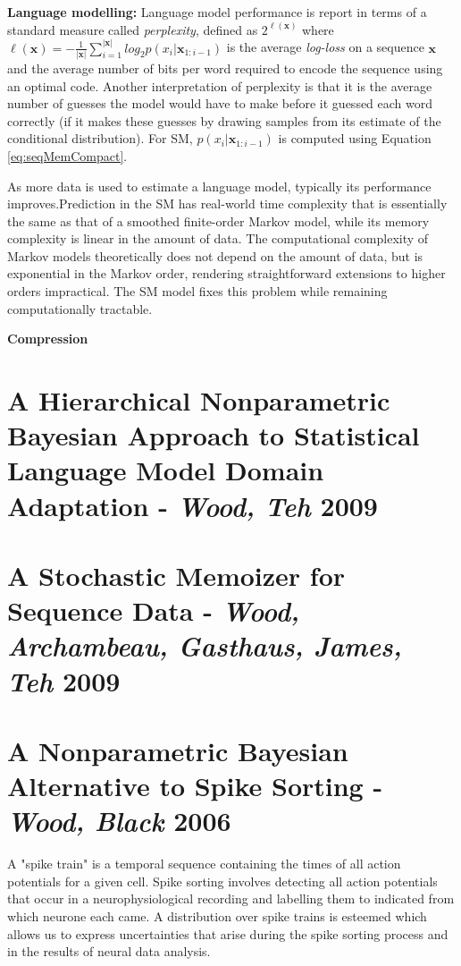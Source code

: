 \textbf{Language modelling:} Language model performance is report in terms of a standard measure called \textit{perplexity}, defined as $2^{\ell(\boldsymbol x)}$ where $\ell(\boldsymbol x)=-\frac{1}{|\boldsymbol x|}\sum_{i=1}^{|\boldsymbol x|}log_{2}p(x_{i}|\boldsymbol x_{1:i-1})$ is the average \textit{log-loss} on a sequence $\boldsymbol x$ and the average number of bits per word required to encode the sequence using an optimal code. Another interpretation of perplexity is that it is the average number of guesses the model would have to make before it guessed each word correctly (if it makes these guesses by drawing samples from its estimate of the conditional distribution). For SM, $p(x_{i}|\boldsymbol x_{1:i-1})$ is computed using Equation \ref{eq:seqMemCompact}.

As more data is used to estimate a language model, typically its performance improves.Prediction in the SM has real-world time complexity that is essentially the same as that of a smoothed finite-order Markov model, while its memory complexity is linear in the amount of data. The computational complexity of Markov models theoretically does not depend on the amount of data, but is exponential in the Markov order, rendering straightforward extensions to higher orders impractical. The SM model fixes this problem while remaining computationally tractable.

\textbf{Compression}



\section{A Hierarchical Nonparametric Bayesian Approach to Statistical Language Model Domain Adaptation - \textit{Wood, Teh} 2009}

\section{A Stochastic Memoizer for Sequence Data - \textit{Wood, Archambeau, Gasthaus, James, Teh} 2009}

\section{A Nonparametric Bayesian Alternative to Spike Sorting - \textit{Wood, Black} 2006}

A "spike train" is a temporal sequence containing the times of all action potentials for a given cell. Spike sorting involves detecting all action potentials that occur in a neurophysiological recording and labelling them to indicated from which neurone each came. A distribution over spike trains is esteemed which allows us to express uncertainties that arise during the spike sorting process and in the results of neural data analysis.

